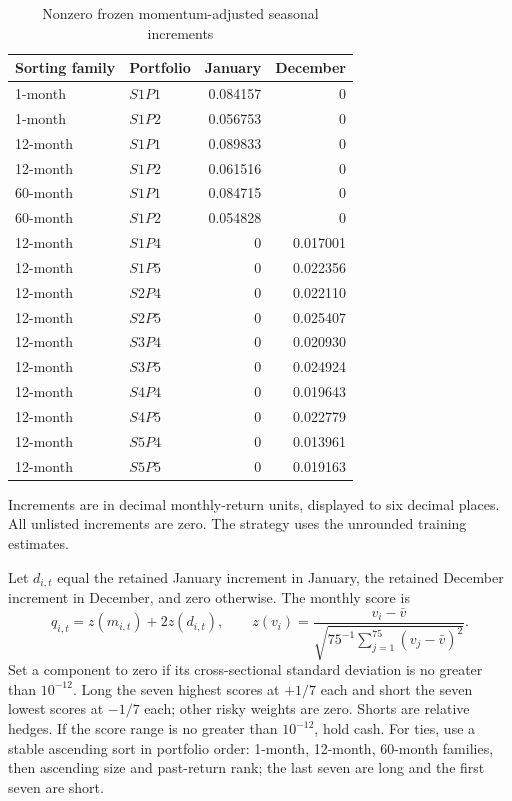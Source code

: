 \documentclass[11pt]{article}
\begin{document}
\begin{table}[htbp]
\centering
\caption{Nonzero frozen momentum-adjusted seasonal increments}
\label{tab:seasonal}
\begin{tabular}{llrr}
\toprule
Sorting family & Portfolio & January & December\\
\midrule
1-month  & $S1P1$ & 0.084157 & 0\\
1-month  & $S1P2$ & 0.056753 & 0\\
12-month & $S1P1$ & 0.089833 & 0\\
12-month & $S1P2$ & 0.061516 & 0\\
60-month & $S1P1$ & 0.084715 & 0\\
60-month & $S1P2$ & 0.054828 & 0\\
\midrule
12-month & $S1P4$ & 0 & 0.017001\\
12-month & $S1P5$ & 0 & 0.022356\\
12-month & $S2P4$ & 0 & 0.022110\\
12-month & $S2P5$ & 0 & 0.025407\\
12-month & $S3P4$ & 0 & 0.020930\\
12-month & $S3P5$ & 0 & 0.024924\\
12-month & $S4P4$ & 0 & 0.019643\\
12-month & $S4P5$ & 0 & 0.022779\\
12-month & $S5P4$ & 0 & 0.013961\\
12-month & $S5P5$ & 0 & 0.019163\\
\bottomrule
\end{tabular}
\par\smallskip
\begin{minipage}{0.9\textwidth}
\footnotesize
Increments are in decimal monthly-return units, displayed to six decimal
places. All unlisted increments are zero. The strategy uses the unrounded
training estimates.
\end{minipage}
\end{table}

Let $d_{i,t}$ equal the retained January increment in January, the retained
December increment in December, and zero otherwise. The monthly score is
\begin{equation}
 q_{i,t}=z(m_{i,t})+2z(d_{i,t}),\qquad
 z(v_i)=\frac{v_i-\bar v}{\sqrt{75^{-1}\sum_{j=1}^{75}(v_j-\bar v)^2}}.
 \label{eq:score}
\end{equation}
Set a component to zero if its cross-sectional standard deviation is no greater
than $10^{-12}$. Long the seven highest scores at $+1/7$ each and short the
seven lowest scores at $-1/7$ each; other risky weights are zero. Shorts are
relative hedges. If the score range is no greater than $10^{-12}$, hold cash.
For ties, use a stable ascending sort in portfolio order: 1-month, 12-month,
60-month families, then ascending size and past-return rank; the last seven
are long and the first seven are short.
\end{document}
